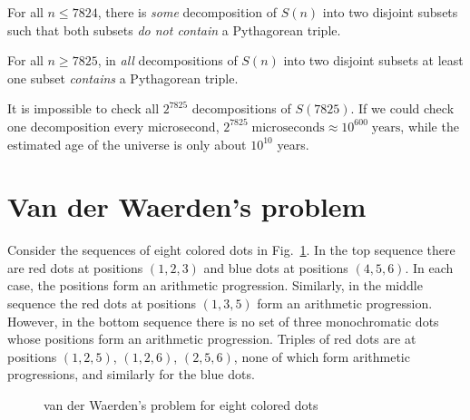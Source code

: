 \begin{theorem}
For all $n\leq 7824$, there is \emph{some} decomposition of $S(n)$ into two disjoint subsets such that both subsets \emph{do not contain} a Pythagorean triple.
\end{theorem}

\begin{theorem}
For all $n\geq 7825$, in \emph{all} decompositions of $S(n)$ into two disjoint subsets at least one subset \emph{contains} a Pythagorean triple.
\end{theorem}
It is impossible to check all $2^{7825}$ decompositions of $S(7825)$. If we could check one decomposition every microsecond, $2^{7825}\; \textrm{microseconds}\approx 10^{600}\; \textrm{years}$, while the estimated age of the universe is only about $10^{10}$ years.




\section{Van der Waerden's problem}\label{s.van}

Consider the sequences of eight colored dots in Fig.~\ref{f.vdw1}. In the top sequence there are red dots at positions $(1,2,3)$ and blue dots at positions $(4,5,6)$. In each case, the positions form an arithmetic progression. Similarly, in the middle sequence the red dots at positions $(1,3,5)$ form an arithmetic progression. However, in the bottom sequence there is no set of three monochromatic dots whose positions form an arithmetic progression. 
Triples of red dots are at positions $(1,2,5)$, $(1,2,6)$, $(2,5,6)$, none of which form arithmetic progressions, and similarly for the blue dots.

\begin{figure}[htb]
\begin{center}
\end{center}
\caption{van der Waerden's problem for eight colored dots}\label{f.vdw1}
\end{figure}

